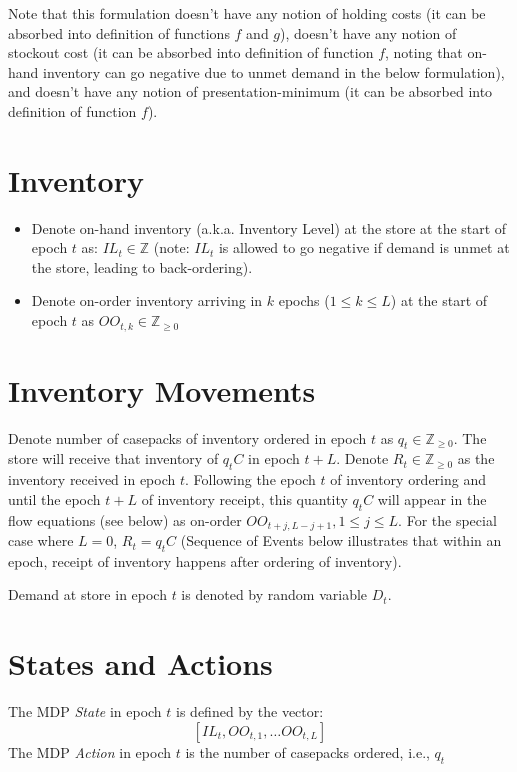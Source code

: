 \documentclass[12pt]{amsart}
\begin{document}
Note that this formulation doesn't have any notion of holding costs (it can be absorbed into definition of functions $f$ and $g$), doesn't have any notion of stockout cost (it can be absorbed into definition of function $f$, noting that on-hand inventory can go negative due to unmet demand in the below formulation), and doesn't have any notion of presentation-minimum (it can be absorbed into definition of function $f$).

\section{Inventory}
\begin{itemize}
\item Denote on-hand inventory (a.k.a. Inventory Level) at the store at the start of epoch $t$ as: $IL_t \in \mathbb{Z}$ (note: $IL_t$ is allowed to go negative if demand is unmet at the store, leading to back-ordering).
\item Denote on-order inventory arriving in $k$ epochs ($1 \leq k \leq L$) at the start of epoch $t$ as $OO_{t,k} \in \mathbb{Z}_{\geq 0}$
\end{itemize}

\section{Inventory Movements}
Denote number of casepacks of inventory ordered in epoch $t$ as $q_t \in \mathbb{Z}_{\geq 0}$. The store will receive that inventory of $q_t  C$ in epoch $t + L$. Denote $R_t \in \mathbb{Z}_{\geq 0}$ as the inventory received in epoch $t$. Following the epoch $t$ of inventory ordering and until the epoch $t+L$ of inventory receipt, this quantity $q_t C$ will appear in the flow equations (see below) as on-order $OO_{t+j,L-j+1}, 1 \leq j \leq L$. For the special case where $L = 0$, $R_t = q_t C$ (Sequence of Events below illustrates that within an epoch, receipt of inventory happens after ordering of inventory).

Demand at store in epoch $t$ is denoted by random variable $D_t$.

\section{States and Actions}
The MDP {\em State} in epoch $t$ is defined by the vector:
 $$[IL_t, OO_{t,1}, \ldots OO_{t,L}]$$
 The MDP {\em Action} in epoch $t$ is the number of casepacks ordered, i.e., $q_t$
\end{document}
